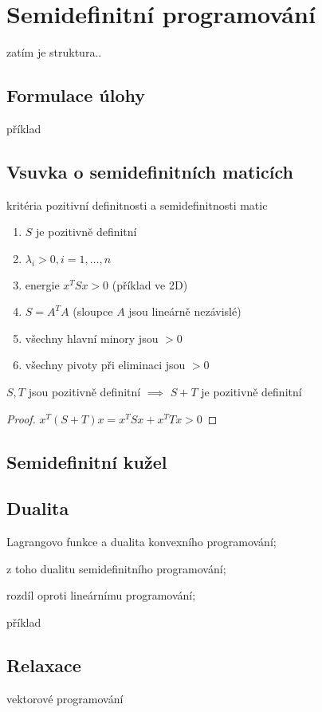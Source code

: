 \chapter{Semidefinitní programování}

zatím je struktura.. 

\section{Formulace úlohy}
\noindent příklad

\section{Vsuvka o semidefinitních maticích}

kritéria pozitivní definitnosti a semidefinitnosti matic

\begin{enumerate}
    \item $S$ je pozitivně definitní
    \item $\lambda_i > 0, i=1, \dots, n$
    \item energie $x^TSx > 0$ (příklad ve 2D)
    \item $S = A^TA$ (sloupce $A$ jsou lineárně nezávislé)
    \item všechny hlavní minory jsou $> 0$
    \item všechny pivoty při eliminaci jsou $> 0$
\end{enumerate}


\begin{vt}
$S, T$ jsou pozitivně definitní $\implies$ $S + T$ je pozitivně definitní
\end{vt}

\begin{proof}
$x^T (S+T) x = x^T S x + x^T T x > 0$
\end{proof}


\section{Semidefinitní kužel}



\section{Dualita}
\noindent Lagrangovo funkce a dualita konvexního programování;

\noindent z toho dualitu semidefinitního programování;

\noindent rozdíl oproti lineárnímu programování;

\noindent příklad

\section{Relaxace}
\noindent vektorové programování

